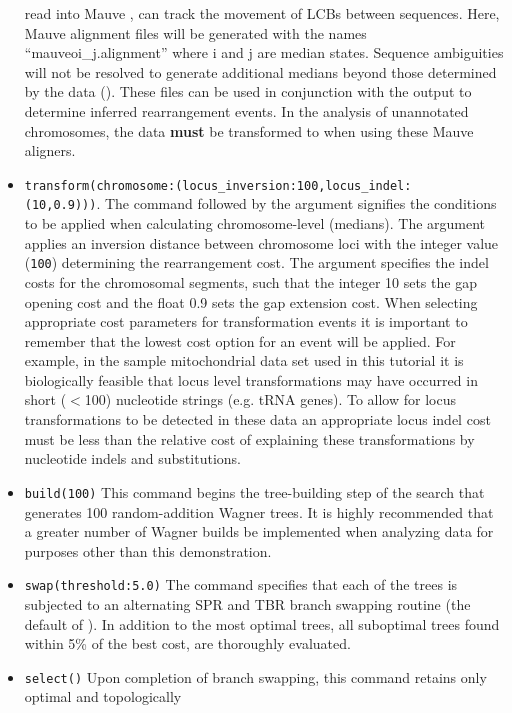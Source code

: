 \begin{itemize}
read into Mauve \cite{darlingetal2004}, can track the movement of LCBs between sequences. 
Here, Mauve  alignment files will be generated with the names ``mauveoi\_j.alignment'' where i and j are median 
states. Sequence ambiguities will not be resolved to generate additional medians beyond those determined by the 
data (). These files can be used in conjunction with the  
 output to determine inferred rearrangement events. In the analysis of unannotated 
chromosomes, the data {\bf must} be transformed to  when using these Mauve aligners.
\item \texttt{transform(chromosome:(locus\_inversion:100,locus\_indel:\\(10,0.9)))}.  The  
command followed by the argument  signifies the conditions to be applied when calculating 
chromosome-level (medians).  The argument  applies an inversion distance 
between chromosome loci with the integer value (\texttt{100}) determining the rearrangement cost. The argument 
 specifies the indel costs for the chromosomal segments, such that the integer 10 
sets the gap opening cost and the float 0.9 sets the gap extension cost.  When selecting appropriate cost parameters
for transformation events it is important to remember that the lowest cost option for an event will be applied. For example,
in the sample mitochondrial data set used in this tutorial it is biologically feasible that locus level transformations may 
have occurred in short ($<$100) nucleotide strings (e.g. tRNA genes). To allow for locus transformations to be detected
in these data an appropriate locus indel cost must be less than the relative cost of explaining these transformations 
by nucleotide indels and substitutions.  
\item \texttt{build(100)} This command begins the tree-building step of the search that generates 100 random-addition 
Wagner trees. It is highly recommended that a greater number of Wagner builds be implemented when analyzing 
data for purposes other than this demonstration.
\item \texttt{swap(threshold:5.0)} The  command specifies that each of the trees is subjected to an alternating 
SPR and TBR branch swapping routine (the default of \poy). In addition to the most optimal trees, all suboptimal trees
found within 5\% of the best cost, are thoroughly evaluated.
\item \texttt{select()} Upon completion of branch swapping, this command retains only optimal and topologically 

\end{itemize}
